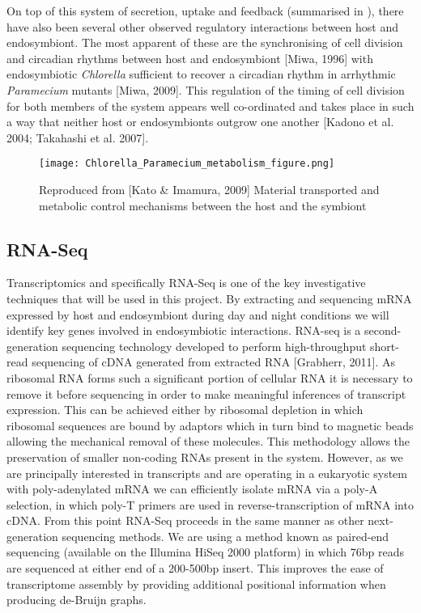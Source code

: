 \documentclass[a4paper,11pt]{article}
\begin{document}
On top of this system of secretion, uptake and feedback (summarised in ), there have also been several other observed regulatory interactions between host and endosymbiont.  
The most apparent of these are the synchronising of cell division and circadian rhythms between host and endosymbiont [Miwa, 1996] with endosymbiotic \textit{Chlorella} sufficient to recover a circadian rhythm in arrhythmic \textit{Paramecium} mutants [Miwa, 2009].  
This regulation of the timing of cell division for both members of the system appears well co-ordinated and takes place in such a way that neither host or endosymbionts outgrow one another [Kadono et al. 2004; Takahashi et al. 2007].


\begin{figure}
  \begin{center}
    \texttt{[image: Chlorella\_Paramecium\_metabolism\_figure.png]}
    \caption{Reproduced from [Kato \& Imamura, 2009] Material transported and metabolic control mechanisms between the host and the symbiont}
        \label{fig:summary_from_book}
  \end{center}
\end{figure}


\subsection{RNA-Seq}
Transcriptomics and specifically RNA-Seq is one of the key investigative techniques that will be used in this project.  
By extracting and sequencing mRNA expressed by host and endosymbiont during day and night conditions we will identify key genes involved in endosymbiotic interactions.
RNA-seq is a second-generation sequencing technology developed to perform high-throughput short-read sequencing of cDNA generated from extracted RNA [Grabherr, 2011]. 
As ribosomal RNA forms such a significant portion of cellular RNA it is necessary to remove it before sequencing in order to make meaningful inferences of transcript expression.  
This can be achieved either by ribosomal depletion in which ribosomal sequences are bound by adaptors which in turn bind to magnetic beads allowing the mechanical removal of these molecules.  
This methodology allows the preservation of smaller non-coding RNAs present in the system. However, as we are principally interested in transcripts and are operating in a eukaryotic system with poly-adenylated mRNA we can efficiently isolate mRNA via a poly-A selection, in which poly-T primers are used in reverse-transcription of mRNA into cDNA.
From this point RNA-Seq proceeds in the same manner as other next-generation sequencing methods. 
We are using a method known as paired-end sequencing (available on the Illumina HiSeq 2000 platform) in which 76bp reads are sequenced at either end of a 200-500bp insert. 
This improves the ease of transcriptome assembly by providing additional positional information when producing de-Bruijn graphs. 
\end{document}
